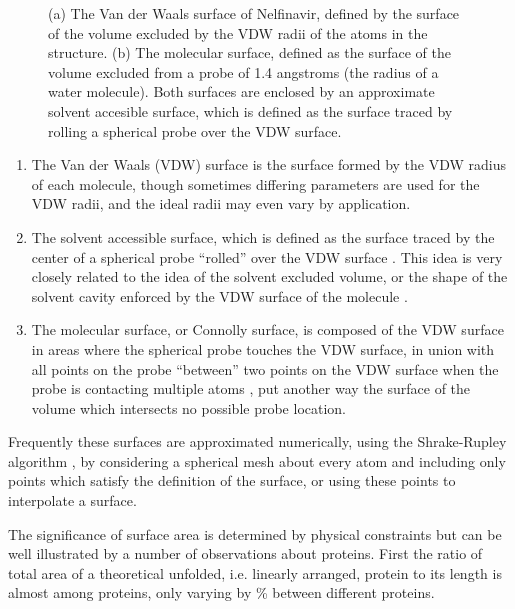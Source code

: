\begin{figure}[h!]
\begin{subfigure}[b]{0.4\textwidth}
\caption{}
\label{figure:molecular_surface}
\end{subfigure}
\caption{(a) The Van der Waals surface of Nelfinavir, defined by the surface of the volume excluded by the VDW radii of the atoms in the structure.
(b) The molecular surface, defined as the surface of the volume excluded from a probe of 1.4 angstroms (the radius of a water molecule).
Both surfaces are enclosed by an approximate solvent accesible surface, which is defined as the surface traced by rolling a spherical probe over the VDW surface.}
\label{figure:surfaces}
\end{figure}
\begin{enumerate}
\item The Van der Waals (VDW) surface is the surface formed by the VDW radius of each molecule, though sometimes differing parameters are used for the VDW radii, and the ideal radii may even vary by application.
\item The solvent accessible surface, which is defined as the surface traced by the center of a spherical probe ``rolled'' over the VDW surface \cite{richards1977areas}.  This idea is very closely related to the idea of the solvent excluded volume, or the shape of the solvent cavity enforced by the VDW surface of the molecule \cite{richmond1984solvent}.
\item The molecular surface, or Connolly surface, is composed of the VDW surface in areas where the spherical probe touches the VDW surface, in union with all points on the probe ``between'' two points on the VDW surface when the probe is contacting multiple atoms \cite{connolly1983analytical}, put another way the surface of the volume which intersects no possible probe location.
\end{enumerate}
Frequently these surfaces are approximated numerically, using the Shrake-Rupley algorithm \cite{shrake1973environment}, by considering a spherical mesh about every atom and including only points which satisfy the definition of the surface, or using these points to interpolate a surface.

The significance of surface area is determined by physical constraints but can be well illustrated by a number of observations about proteins.
First the ratio of total area of a theoretical unfolded, i.e. linearly arranged, protein to its length is almost among proteins, only varying by \% between different proteins.
